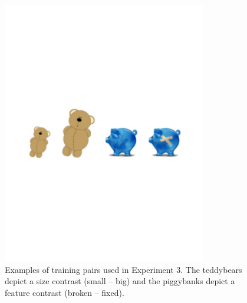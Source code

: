\documentclass[10pt,letterpaper]{article}
\begin{document}
\begin{figure}[t] 
  \begin{center} 
    \includegraphics[width=3.5in]{figures/opposites_demo_long.pdf} 
    \caption{\label{fig:training} Examples of training pairs used in Experiment 3.  The teddybears depict a size contrast (small -- big) and the piggybanks depict a feature contrast (broken -- fixed).}
  \end{center} 
\end{figure}


\end{document}
